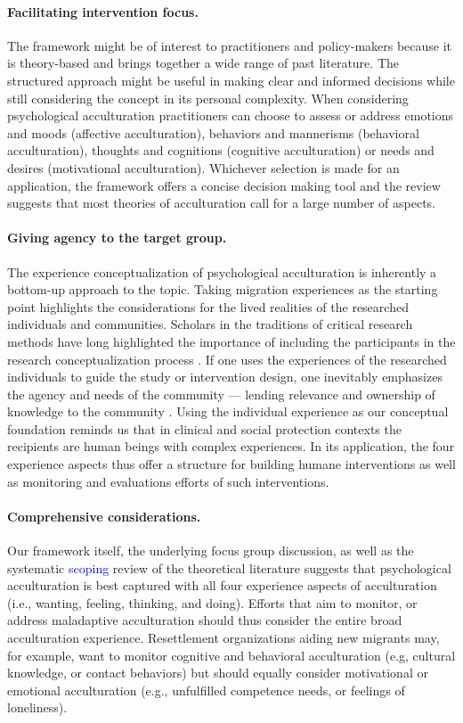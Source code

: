 \documentclass[man, 12pt, a4paper, mask]{apa7}
\begin{document}
\paragraph{Facilitating intervention focus.} The framework might be of interest to practitioners and policy-makers because it is theory-based and brings together a wide range of past literature. The structured approach might be useful in making clear and informed decisions while still considering the concept in its personal complexity. When considering psychological acculturation practitioners can choose to assess or address emotions and moods (affective acculturation), behaviors and mannerisms (behavioral acculturation), thoughts and cognitions (cognitive acculturation) or needs and desires (motivational acculturation). Whichever selection is made for an application, the framework offers a concise decision making tool and the review suggests that most theories of acculturation call for a large number of aspects.

\paragraph{Giving agency to the target group.} The experience conceptualization of psychological acculturation is inherently a bottom-up approach to the topic. Taking migration experiences as the starting point highlights the considerations for the lived realities of the researched individuals and communities. Scholars in the traditions of critical research methods have long highlighted the importance of including the participants in the research conceptualization process \citep[e.g.,][]{Kovach2009}. If one uses the experiences of the researched individuals to guide the study or intervention design, one inevitably emphasizes the agency and needs of the community --- lending relevance and ownership of knowledge to the community \citep[e.g., ][]{Schmidt2021}. Using the individual experience as our conceptual foundation reminds us that in clinical and social protection contexts the recipients are human beings with complex experiences. In its application, the four experience aspects thus offer a structure for building humane interventions as well as monitoring and evaluations efforts of such interventions. 

\paragraph{Comprehensive considerations.} Our framework itself, the underlying focus group discussion, as well as the systematic \textcolor{blue}{scoping} review of the theoretical literature suggests that psychological acculturation is best captured with all four experience aspects of acculturation (i.e., wanting, feeling, thinking, and doing). Efforts that aim to monitor, or address maladaptive acculturation should thus consider the entire broad acculturation experience. Resettlement organizations aiding new migrants may, for example, want to monitor cognitive and behavioral acculturation (e.g, cultural knowledge, or contact behaviors) but should equally consider motivational or emotional acculturation (e.g., unfulfilled competence needs, or feelings of loneliness). 
\end{document}
